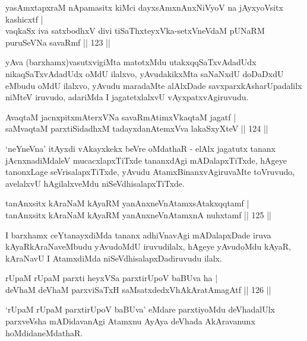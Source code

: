 \begin{shl}
yasAmxtapxraM nApamasitx kiMci dayxsAmxnAnxNiVyoV na jAyxyoV\s sitx kashicxtf |\\
vaqkaSx iva satxbodhxV divi tiSaThxteyxVka-setxVneVdaM pUNaRM puruSeVNa savaRmf \hfill || 123 ||
\end{shl}

\begin{artha}
yAva (barxhamx)vasutxvigiMta matotxMdu utakxqqSaTxvAdadUdx nikaqSaTxvAdadUdx oMdU ilalxvo, yAvudakikxMta saNaNxdU doDaDxdU eMbudu oMdU ilalxvo, yAvudu maradaMte alAlxDade savxparxkAsharUpadalilx niMteV iruvudo, adariMda I jagatetxlalxvU vAyxpatxvAgiruvudu.
\end{artha}

\begin{shl}
AvaqtaM jacnxpitxmAterxVNa savaRmAtimxVkaqtaM jagatf |\\
saMvaqtaM parxtiSidadhxM tadayxdanAtemxVva lakaSxyXteV \hfill || 124 ||
\end{shl}

\begin{artha}
`neYneVna' itAyxdi vAkayxkekx beVre oMdathaR - elAlx jagatutx tananx
  jAcnxnadiMdaleV mucacxlapxTiTxde tananxdAgi mADalapxTiTxde, hAgeye
  tanonxLage seVrisalapxTiTxde, yAvudu AtamxBinanxvAgiruvaMte
  toVruvudo, avelalxvU hAgilalxveMdu niSeVdhisalapxTiTxde.
\end{artha}

\begin{shl}
tanAnxsitx kAraNaM kAyaRM yanAnxneVnA\s \s tamxsAtakxqqtamf |\\
tanAnxsitx kAraNaM kAyaRM yanAnxneVnA\s \s tamxnA nuhxtamf \hfill || 125 ||
\end{shl}

\begin{artha}
I barxhamx ceYtanayxdiMda tananx adhiVnavAgi mADalapxDade iruva kAyaRkAraNaveMbudu yAvudoMdU iruvudilalx, hAgeye yAvudoMdu kAyaR, kAraNavU I AtamxdiMda niSeVdhisalapxDadiruvudu ilalx.
\end{artha}


\begin{shl}
rUpaM rUpaM parxti heyxVSa parxtirUpoV baBUva ha |\\
deVhaM deVhaM parxviSaTxH saMsatxdedxVhAkAratAmagAtf \hfill || 126 ||
\end{shl}

\begin{artha}
`rUpaM rUpaM parxtirUpoV baBUva' eMdare parxtiyoMdu deVhadalUlx parxveVsha mADidavanAgi   Atamxnu AyAya deVhada AkAravanunx hoMdidaneMdathaR.
\end{artha}

